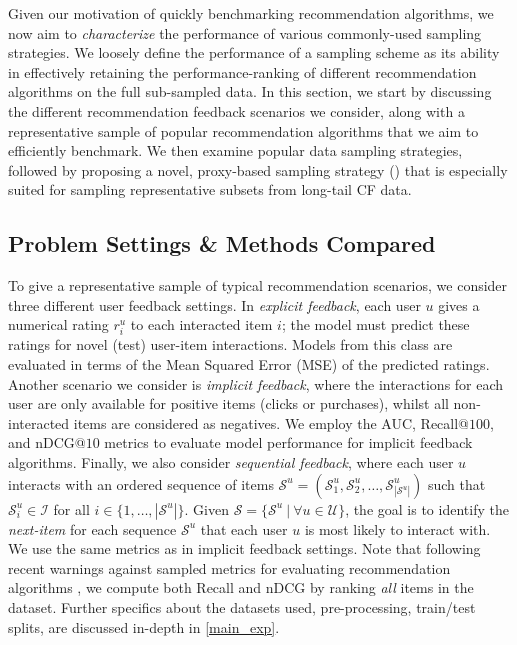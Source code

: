 Given our motivation of quickly benchmarking recommendation algorithms, we now aim to \emph{characterize} the performance of various commonly-used sampling strategies. We loosely define the performance of a sampling scheme as 
its
ability in effectively retaining the performance-ranking of different recommendation algorithms on the full \vs sub-sampled data. In this section, we start by discussing the different recommendation feedback scenarios we consider, along with a representative sample of popular recommendation algorithms that we aim to efficiently benchmark. We then examine popular data sampling strategies, followed by proposing a novel, proxy-based sampling strategy (\sampler) that is especially suited for sampling representative subsets from long-tail CF data.

\subsection{Problem Settings \& Methods Compared} \label{feedback_types} \label{algorithms}
To give a representative sample of typical recommendation scenarios, we consider three different user feedback settings. In \emph{explicit feedback}, each user $u$ gives a numerical rating $r^u_i$ to each interacted item $i$; the model must predict these ratings for novel (test) user-item interactions. Models from this class are evaluated in terms of the Mean Squared Error (MSE) of the predicted ratings. Another scenario we consider is \emph{implicit feedback}, where the interactions for each user are only available for positive items (\eg clicks or purchases), whilst all non-interacted items are considered as negatives. We employ the AUC, Recall@$100$, and nDCG@$10$ metrics to evaluate model performance for implicit feedback algorithms. Finally, we also consider \emph{sequential feedback}, where each user $u$ interacts with an ordered sequence of items $\mathcal{S}^u = (\mathcal{S}^u_1, \mathcal{S}^u_2, \ldots, \mathcal{S}^u_{|\mathcal{S}^u|})$ such that $\mathcal{S}^u_i \in \mathcal{I}$ for all $i \in \{1, \ldots, |\mathcal{S}^u|\}$. Given $\mathcal{S} = \{ \mathcal{S}^u ~|~ \forall u \in \mathcal{U} \}$, the goal is to identify the \emph{next-item} for each sequence $\mathcal{S}^u$ that each user $u$ is most likely to interact with. We use the same metrics as in implicit feedback settings. Note that following recent warnings against sampled metrics for evaluating recommendation algorithms \cite{sampled_metrics, castells_sampling}, we compute both Recall and nDCG by ranking \emph{all} items in the dataset. Further specifics about the datasets used, pre-processing, train/test splits, \etc are discussed in-depth in \cref{main_exp}. 

